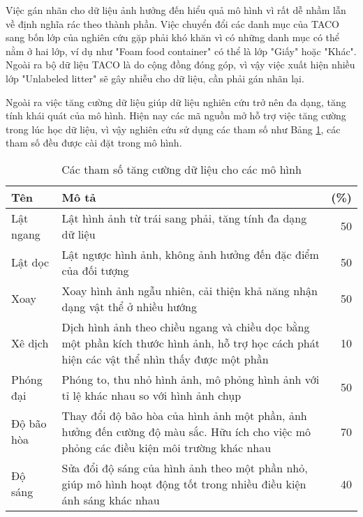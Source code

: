 \documentclass[../the.tex]{subfiles}
\begin{document}
\bigskip

{\fontsize{13}{12} \selectfont

	Việc gán nhãn cho dữ liệu ảnh hưởng đến hiểu quả mô hình vì rất dễ nhầm lẫn về định nghĩa rác theo thành phần.
	Việc chuyển đổi các danh mục của TACO sang bốn lớp của nghiên cứu gặp phải khó khăn vì có những danh mục có thể nằm ở hai lớp, ví dụ như "Foam food container" có thể là lớp  "Giấy" hoặc "Khác".
	Ngoài ra bộ dữ liệu TACO là do cộng đồng đóng góp, vì vậy việc xuất hiện nhiều lớp "Unlabeled litter" sẽ gây nhiễu cho dữ liệu, cần phải gán nhãn lại.

}

\bigskip

{\fontsize{13}{12} \selectfont
	Ngoài ra việc tăng cường dữ liệu giúp dữ liệu nghiên cứu trở nên đa dạng, tăng tính khái quát của mô hình. Hiện nay các mã nguồn mở hỗ trợ việc tăng cường trong lúc học dữ liệu, vì vậy nghiên cứu sử dụng các tham số như Bảng \ref{tab:thamso}, các tham số đều được cài đặt trong mô hình.

}
\begin{table}[H]
	\centering
	\caption{Các tham số tăng cường dữ liệu cho các mô hình}
	\begin{tabular}{|l|p{10cm}|r|}
		\hline
		\textbf{Tên}
		           & \textbf{Mô tả}
		           & \textbf{(\%)}
		\\ \hline
		Lật ngang  & Lật hình ảnh từ trái sang phải, tăng tính đa dạng dữ liệu                                                                                    & 50 \\  \hline
		Lật dọc    & Lật ngược hình ảnh, không ảnh hưởng đến đặc điểm của đối tượng                                                                               & 50 \\  \hline
		Xoay       & Xoay hình ảnh ngẫu nhiên, cải thiện khả năng nhận dạng vật thể ở nhiều hướng                                                                 & 50 \\  \hline
		Xê dịch    & Dịch hình ảnh theo chiều ngang và chiều dọc bằng một phần kích thước hình ảnh, hỗ trợ học cách phát hiện các vật thể nhìn thấy được một phần & 10 \\  \hline
		Phóng đại  & Phóng to, thu nhỏ hình ảnh, mô phỏng hình ảnh với tỉ lệ khác nhau so với hình ảnh chụp                                                       & 50 \\  \hline
		Độ bão hòa & Thay đổi độ bão hòa của hình ảnh một phần, ảnh hưởng đến cường độ màu sắc. Hữu ích cho việc mô phỏng các điều kiện môi trường khác nhau      & 70 \\ \hline
		Độ sáng    & Sửa đổi độ sáng của hình ảnh theo một phần nhỏ, giúp mô hình hoạt động tốt trong nhiều điều kiện ánh sáng khác nhau                          & 40 \\ \hline
	\end{tabular}
	\label{tab:thamso}
\end{table}
\end{document}
